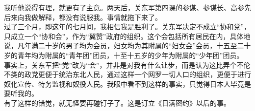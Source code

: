 我听他说得有理，就更有了主意。两天后，关东军第四课的参谋、参谋长、高参先后来向我做解释，都没有说服我。事情就拖下来了。\\

过了三个月，即这年的七月间，我相信我是胜利了。关东军决定不成立“协和党”，只成立一个“协和会”，作为“翼赞”政府的组织。这个会包括所有居民在内，具体地说，凡年满二十岁的男子均为会员，妇女均为其附属的“妇女会”会员，十五至二十岁的青年均为附属的“青年团”团员，十至十五岁的少年为附属的“少年团”团员。\\

事实上，关东军把“党”改为“会”，并非是对我有什么让步，而是认为这比弄个不伦不类的政党更便于统治东北人民，通过这样一个网罗一切人口的组织，更便于进行奴化宣传、特务监视和奴役人民。我眼中看不到这样的事实，只觉得日本人毕竟是要听我的。\\

有了这样的错觉，就无怪要再碰钉子了。这是订立《日满密约》以后的事。
